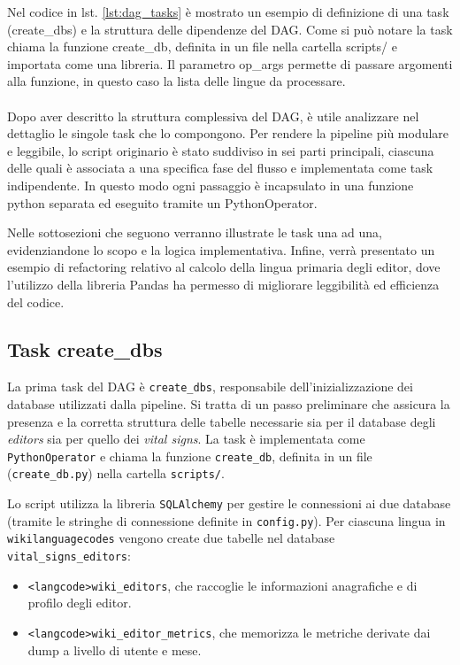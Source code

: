 Nel codice in lst. \ref{lst:dag_tasks} è mostrato un esempio di definizione di una task (create\_dbs) e la struttura delle dipendenze del DAG.
Come si può notare la task chiama la funzione create\_db, definita in un file nella cartella scripts/ e importata come una libreria.
Il parametro op\_args permette di passare argomenti alla funzione, in questo caso la lista delle lingue da processare.
\paragraph{}
Dopo aver descritto la struttura complessiva del DAG, è utile analizzare nel dettaglio le singole task che lo compongono.
Per rendere la pipeline più modulare e leggibile, lo script originario è stato suddiviso in sei parti principali, ciascuna delle quali è associata a una specifica fase del flusso e implementata come task indipendente. In questo modo ogni passaggio è incapsulato in una funzione python separata ed eseguito tramite un PythonOperator.

Nelle sottosezioni che seguono verranno illustrate le task una ad una, evidenziandone lo scopo e la logica implementativa.
Infine, verrà presentato un esempio di refactoring relativo al calcolo della lingua primaria degli editor, dove l’utilizzo della libreria Pandas ha permesso di migliorare leggibilità ed efficienza del codice.
\subsection{Task create\_dbs}
\label{subsec:create_dbs}

La prima task del DAG è \texttt{create\_dbs}, responsabile dell’inizializzazione dei database utilizzati dalla pipeline. 
Si tratta di un passo preliminare che assicura la presenza e la corretta struttura delle tabelle necessarie sia per il database degli \emph{editors} sia per quello dei \emph{vital signs}. 
La task è implementata come \texttt{PythonOperator} e chiama la funzione \texttt{create\_db}, definita in un file (\texttt{create\_db.py}) nella cartella \texttt{scripts/}.

Lo script utilizza la libreria \texttt{SQLAlchemy} per gestire le connessioni ai due database (tramite le stringhe di connessione definite in \texttt{config.py}). 
Per ciascuna lingua in \texttt{wikilanguagecodes} vengono create due tabelle nel database \texttt{vital\_signs\_editors}:

\begin{itemize}
    \item \texttt{<langcode>wiki\_editors}, che raccoglie le informazioni anagrafiche e di profilo degli editor.
    \item \texttt{<langcode>wiki\_editor\_metrics}, che memorizza le metriche derivate dai dump a livello di utente e mese.
\end{itemize}

